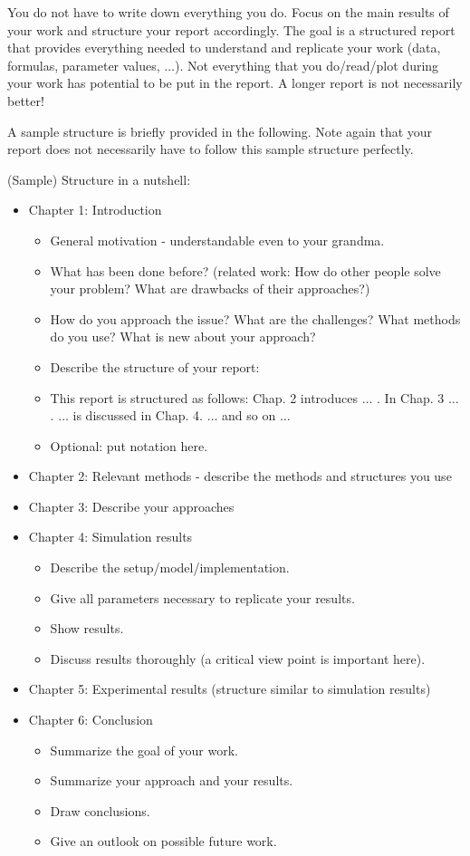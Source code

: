 You do not have to write down everything you do. Focus on the main results of your work and structure your report accordingly. The goal is a structured report that provides everything needed to understand and replicate your work (data, formulas, parameter values, $\ldots$). Not everything that you do/read/plot during your work has potential to be put in the report. A longer report is not necessarily better!

A sample structure is briefly provided in the following. Note again that your report does not necessarily have to follow this sample structure perfectly.

\vspace{\baselineskip}


(Sample) Structure in a nutshell:

\begin{itemize}
	\item Chapter 1: Introduction
	\begin{itemize}
			\item General motivation - understandable even to your grandma.
			\item What has been done before? (related work: How do other people solve your problem? What are drawbacks of their approaches?)
			\item How do you approach the issue? What are the challenges? What methods do you use? What is new about your approach?
			\item Describe the structure of your report: 
			\item This report is structured as follows: Chap. 2 introduces $\ldots$ . In Chap. 3 $\ldots$ . $\ldots$ is discussed in Chap. 4. $\ldots$ and so on $\ldots$
			\item Optional: put notation here.
	\end{itemize}
	\item Chapter 2: Relevant methods - describe the methods and structures you use
	\item Chapter 3: Describe your approaches
	\item Chapter 4: Simulation results
	\begin{itemize}
			\item Describe the setup/model/implementation.
			\item Give all parameters necessary to replicate your results.
			\item Show results.
			\item Discuss results thoroughly (a critical view point is important here).		
	\end{itemize}
	\item Chapter 5: Experimental results (structure similar to simulation results)
	\item Chapter 6: Conclusion
	\begin{itemize}
			\item Summarize the goal of your work.
			\item Summarize your approach and your results.
			\item Draw conclusions.
			\item Give an outlook on possible future work.
	\end{itemize}
\end{itemize}

